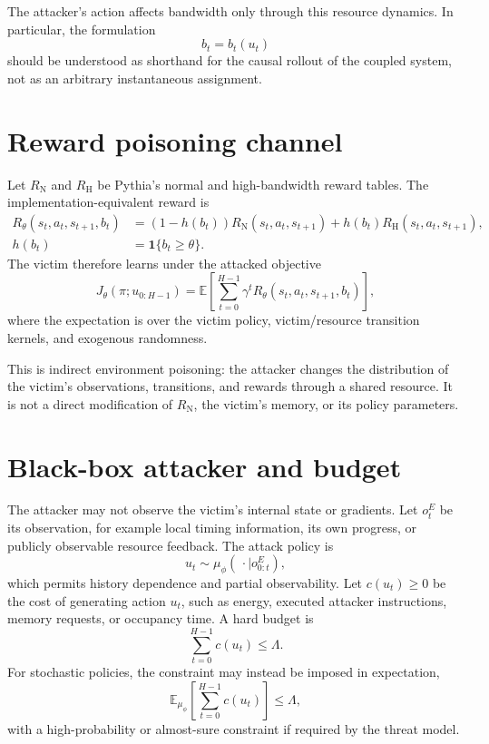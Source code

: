 \documentclass[11pt]{article}
\newcommand{\Eexp}{\mathbb{E}}
\begin{document}
The attacker's action affects bandwidth only through this resource dynamics. In particular, the formulation
\[
 b_t = b_t(u_t)
\]
should be understood as shorthand for the causal rollout of the coupled system, not as an arbitrary instantaneous assignment.

\section{Reward poisoning channel}

Let $R_{\mathrm{N}}$ and $R_{\mathrm{H}}$ be Pythia's normal and high-bandwidth reward tables. The implementation-equivalent reward is
\begin{align}
 R_\theta(s_t,a_t,s_{t+1},b_t)
 &= (1-h(b_t))R_{\mathrm{N}}(s_t,a_t,s_{t+1})
    + h(b_t)R_{\mathrm{H}}(s_t,a_t,s_{t+1}),\\
 h(b_t) &= \mathbf{1}\{b_t\geq\theta\}.
\end{align}
The victim therefore learns under the attacked objective
\[
 J_\theta(\pi;u_{0:H-1})
 = \Eexp\left[
   \sum_{t=0}^{H-1}\gamma^t
   R_\theta(s_t,a_t,s_{t+1},b_t)
 \right],
\]
where the expectation is over the victim policy, victim/resource transition kernels, and exogenous randomness.

This is indirect environment poisoning: the attacker changes the distribution of the victim's observations, transitions, and rewards through a shared resource. It is not a direct modification of $R_{\mathrm{N}}$, the victim's memory, or its policy parameters.

\section{Black-box attacker and budget}

The attacker may not observe the victim's internal state or gradients. Let $o^E_t$ be its observation, for example local timing information, its own progress, or publicly observable resource feedback. The attack policy is
\[
 u_t \sim \mu_\phi(\,\cdot\mid o^E_{0:t}),
\]
which permits history dependence and partial observability. Let $c(u_t)\geq 0$ be the cost of generating action $u_t$, such as energy, executed attacker instructions, memory requests, or occupancy time. A hard budget is
\[
 \sum_{t=0}^{H-1} c(u_t) \leq \Lambda.
\]
For stochastic policies, the constraint may instead be imposed in expectation,
\[
 \Eexp_{\mu_\phi}\left[\sum_{t=0}^{H-1}c(u_t)\right]\leq\Lambda,
\]
with a high-probability or almost-sure constraint if required by the threat model.
\end{document}
